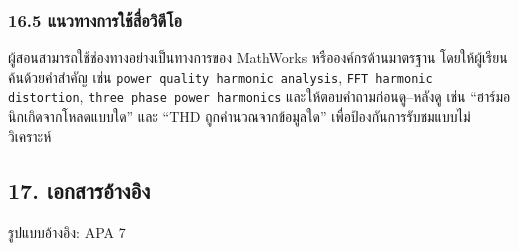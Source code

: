 \subsubsection{16.5 แนวทางการใช้สื่อวิดีโอ}

ผู้สอนสามารถใช้ช่องทางอย่างเป็นทางการของ MathWorks หรือองค์กรด้านมาตรฐาน โดยให้ผู้เรียนค้นด้วยคำสำคัญ เช่น \texttt{power quality harmonic analysis}, \texttt{FFT harmonic distortion}, \texttt{three phase power harmonics} และให้ตอบคำถามก่อนดู–หลังดู เช่น “ฮาร์มอนิกเกิดจากโหลดแบบใด” และ “THD ถูกคำนวณจากข้อมูลใด” เพื่อป้องกันการรับชมแบบไม่วิเคราะห์

\newpage

\subsection{17. เอกสารอ้างอิง}

รูปแบบอ้างอิง: APA 7

